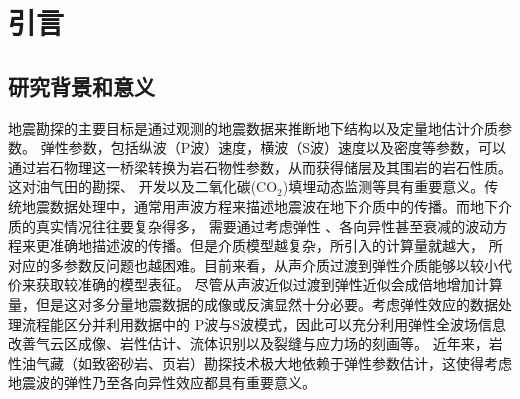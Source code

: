\chapter{引言}
\section{研究背景和意义}
地震勘探的主要目标是通过观测的地震数据来推断地下结构以及定量地估计介质参数。
弹性参数，包括纵波（P波）速度，横波（S波）速度以及密度等参数，可以通过岩石物理这一桥梁转换为岩石物性参数，从而获得储层及其围岩的岩石性质。这对油气田的勘探、
开发以及二氧化碳(CO$_2$)填埋动态监测等具有重要意义。传统地震数据处理中，通常用声波方程来描述地震波在地下介质中的传播。而地下介质的真实情况往往要复杂得多，
需要通过考虑弹性
、各向异性甚至衰减的波动方程来更准确地描述波的传播。但是介质模型越复杂，所引入的计算量就越大，
所对应的多参数反问题也越困难。目前来看，从声介质过渡到弹性介质能够以较小代价来获取较准确的模型表征。
尽管从声波近似过渡到弹性近似会成倍地增加计算量，但是这对多分量地震数据的成像或反演显然十分必要。考虑弹性效应的数据处理流程能区分并利用数据中的
P波与S波模式，因此可以充分利用弹性全波场信息改善气云区成像、岩性估计、流体识别以及裂缝与应力场的刻画等。
近年来，岩性油气藏（如致密砂岩、页岩）勘探技术极大地依赖于弹性参数估计，这使得考虑地震波的弹性乃至各向异性效应都具有重要意义。

